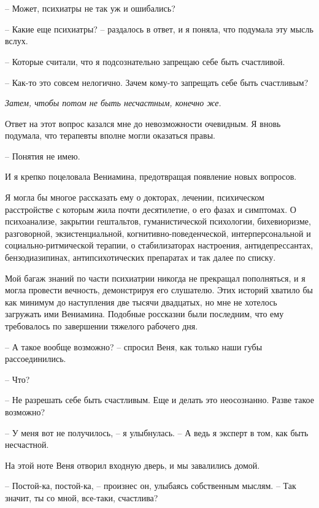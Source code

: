 \documentclass[
]{book}
\begin{document}
\hypertarget{chapter-73}{%
\chapter{~}\label{chapter-73}}

-- Может, психиатры не так уж и ошибались?

-- Какие еще психиатры? -- раздалось в ответ, и я поняла, что подумала эту мысль вслух.

-- Которые считали, что я подсознательно запрещаю себе быть счастливой.

-- Как-то это совсем нелогично. Зачем кому-то запрещать себе быть счастливым?

\emph{Затем, чтобы потом не быть несчастным, конечно же.}

Ответ на этот вопрос казался мне до невозможности очевидным. Я вновь подумала, что терапевты вполне могли оказаться правы.

-- Понятия не имею.

И я крепко поцеловала Вениамина, предотвращая появление новых вопросов.

Я могла бы многое рассказать ему о докторах, лечении, психическом расстройстве с которым жила почти десятилетие, о его фазах и симптомах. О психоанализе, закрытии гештальтов, гуманистической психологии, бихевиоризме, разговорной, экзистенциальной, когнитивно-поведенческой, интерперсональной и социально-ритмической терапии, о стабилизаторах настроения, антидепрессантах, бензодиазипинах, антипсихотических препаратах и так далее по списку.

Мой багаж знаний по части психиатрии никогда не прекращал пополняться, и я могла провести вечность, демонстрируя его слушателю. Этих историй хватило бы как минимум до наступления две тысячи двадцатых, но мне не хотелось загружать ими Вениамина. Подобные россказни были последним, что ему требовалось по завершении тяжелого рабочего дня.

-- А такое вообще возможно? -- спросил Веня, как только наши губы рассоединились.

-- Что?

-- Не разрешать себе быть счастливым. Еще и делать это неосознанно. Разве такое возможно?

-- У меня вот не получилось, -- я улыбнулась. -- А ведь я эксперт в том, как быть несчастной.

На этой ноте Веня отворил входную дверь, и мы завалились домой.

-- Постой-ка, постой-ка, -- произнес он, улыбаясь собственным мыслям. -- Так значит, ты со мной, все-таки, счастлива?
\end{document}
